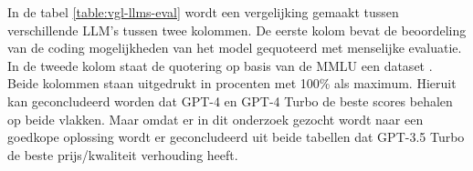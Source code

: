 \begin{table}[h!]
\centering
{}
\caption{Vergelijking LLM's op basis van beoordeling van menselijke evaluatie en MMLU \autocite{ArtificialAnalysis2024}}
\label{table:vgl-llms-eval}
\end{table}

In de tabel \ref{table:vgl-llms-eval} wordt een vergelijking gemaakt tussen verschillende LLM's tussen twee kolommen. 
De eerste kolom bevat de beoordeling van de coding mogelijkheden van het model gequoteerd met menselijke evaluatie. 
In de tweede kolom staat de quotering op basis van de MMLU een dataset \autocite{Hendrycks2020}.
Beide kolommen staan uitgedrukt in procenten met 100\% als maximum.
Hieruit kan geconcludeerd worden dat GPT-4 en GPT-4 Turbo de beste scores behalen op beide vlakken.
Maar omdat er in dit onderzoek gezocht wordt naar een goedkope oplossing wordt er geconcludeerd uit beide tabellen dat GPT-3.5 Turbo de beste prijs/kwaliteit verhouding heeft.

